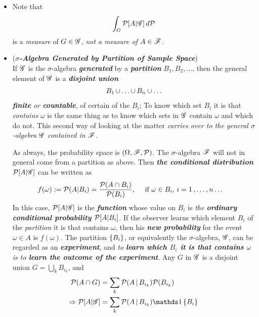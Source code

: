 \documentclass[11pt]{article}
\begin{document}
\begin{itemize}
\item \begin{remark}
Note that 
\begin{align*}
\int_{G} {\mathcal P}[A | {\mathscr G}] \,d{\mathcal P}
\end{align*} is a \emph{measure} of $G \in {\mathscr G}$, \emph{not a measure of $A \in {\mathscr F}$}. 
\end{remark}

\item \begin{remark} (\emph{\textbf{$\sigma$-Algebra Generated by Partition of Sample Space}})\\
If ${\mathscr G}$ is the $\sigma$-algebra \emph{\textbf{generated}} by a \emph{\textbf{partition}} $B_1, B_2, \ldots$, then the general element of ${\mathscr G}$ is a \emph{\textbf{disjoint union}} 
\begin{align*}
B_1 \,{\cup}\ldots{\cup}\, B_n \cup \ldots
\end{align*}
\emph{\textbf{finite} or \textbf{countable}}, of certain of the $B_i$; To know which set $B_i$ it is that \emph{contains} $\omega$ is the same thing as to know which sets in ${\mathscr G}$ contain $\omega$ and which do not. This second way of looking at the matter \emph{carries over to the general $\sigma$-algebra} ${\mathscr G}$ \emph{contained in} ${\mathscr F}$.

As always, the probability space is $(\Omega,  {\mathscr F},  {\mathcal P})$. The $\sigma$-algebra ${\mathscr F}$ will not in general come from a partition as above. Then \emph{\textbf{the conditional distribution}}  ${\mathcal P}[A | {\mathscr G}]$ can be written as 
\begin{align*}
f(\omega) := {\mathcal P}(A | B_i) &= \frac{{\mathcal P}(A \cap B_i)}{{\mathcal P}(B_i)}, \quad \text{ if }\omega \in B_i,\, i=1 \,{,}\ldots{,}\, n \ldots
\end{align*} In this case, ${\mathcal P}[A | {\mathscr G}]$ is the \emph{\textbf{function}} whose value on $B_i$ is \emph{the \textbf{ordinary conditional probability} ${\mathcal P}[A | B_i]$}. If the observer learns which element $B_i$ of the \emph{partition} it is that contains $\omega$, then his \emph{\textbf{new probability}} for the event $\omega \in A$ is $f(\omega)$.  The partition $\left\{B_i\right\}$, or equivalently the $\sigma$-algebra, ${\mathscr G}$, can be regarded as an \emph{\textbf{experiment}}, and \emph{to \textbf{learn which $B_i$ it is that contains $\omega$} is to \textbf{learn the outcome of the experiment}}.  Any $G$ in ${\mathscr G}$ is a disjoint union $G = \bigcup_k B_{i_k}$, and 
\begin{align*}
\cP(A \cap G) &= \sum_{k} \cP(A \,|\, B_{i_k}) \cP(B_{i_k})\\
\Rightarrow \cP[A | \srG] &= \sum_{k} \cP(A \,|\, B_{i_k})\ind{B_i}
\end{align*}
\end{remark}


\end{itemize}
\end{document}
